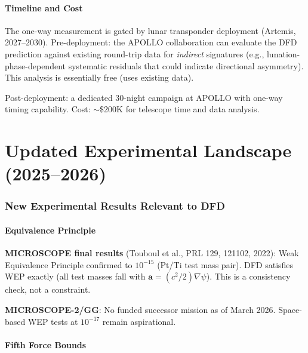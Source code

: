 \documentclass[11pt]{article}
\begin{document}
\subsection*{Timeline and Cost}

The one-way measurement is gated by lunar transponder deployment
(Artemis, 2027--2030). Pre-deployment: the APOLLO collaboration
can evaluate the DFD prediction against existing round-trip data
for \emph{indirect} signatures (e.g., lunation-phase-dependent
systematic residuals that could indicate directional asymmetry).
This analysis is essentially free (uses existing data).

Post-deployment: a dedicated 30-night campaign at APOLLO with
one-way timing capability. Cost: $\sim$\$200K for telescope time
and data analysis.


\part{Updated Experimental Landscape (2025--2026)}
\label{part:landscape}

\section{New Experimental Results Relevant to DFD}
\label{sec:new-results}

\subsection{Equivalence Principle}

\textbf{MICROSCOPE final results} (Touboul et al., PRL 129, 121102,
2022): Weak Equivalence Principle confirmed to $10^{-15}$ (Pt/Ti
test mass pair). DFD satisfies WEP exactly (all test masses fall with
$\mathbf{a} = (c^2/2)\nabla\psi$). This is a consistency check, not
a constraint.

\textbf{MICROSCOPE-2/GG}: No funded successor mission as of March 2026.
Space-based WEP tests at $10^{-17}$ remain aspirational.

\subsection{Fifth Force Bounds}
\end{document}

